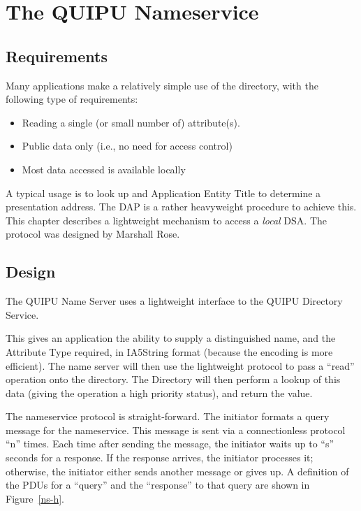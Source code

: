 
\chapter {The QUIPU Nameservice}
\label {ns_design}

\section {Requirements}

Many applications make a relatively simple use of the directory, with the
following type of requirements:

\begin {itemize}
\item  Reading a single (or small number of) attribute(s).

\item  Public data only (i.e., no need for access control)

\item  Most data accessed is available locally
\end {itemize}

A typical usage is to look up and Application Entity Title to determine a
presentation address.
The DAP is a rather heavyweight procedure to achieve this.  
This chapter describes a lightweight mechanism to access a 
{\em local} DSA.   The protocol was designed by Marshall Rose.

\section {Design}

The QUIPU Name Server uses a lightweight interface to the QUIPU Directory
Service.

This gives an application the
ability to supply a distinguished name, and the Attribute Type required, in
IA5String format (because the encoding is more efficient).  The name server
will then use the lightweight protocol to pass a ``read'' operation onto the
directory.  The Directory will then perform a lookup of this data (giving
the operation a high priority status), and return the value.


The nameservice protocol is straight-forward.  The initiator formats a
query message for the nameservice.  This message is sent via a connectionless
protocol ``n'' times.  Each time after sending the message, the initiator
waits up to ``s'' seconds for a response.  If the response arrives, the
initiator processes it; otherwise, the initiator either sends another
message or gives up.  A definition of the PDUs for a ``query'' and the
``response'' to that query are shown in Figure~\ref{ns-h}.  


